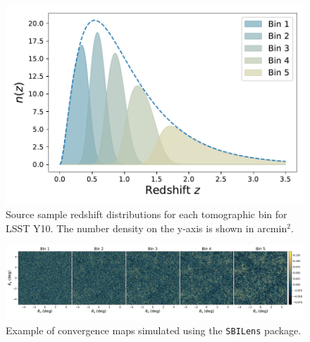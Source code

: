 \documentclass{aa}
\begin{document}
\begin{figure}
    \centering
    \includegraphics[width=\columnwidth]{figures/redshift_distribution_light.pdf}
    \caption{
     Source sample redshift distributions for each tomographic bin for LSST Y10. The number density on the y-axis is shown in arcmin$^2$.
    }
     \label{fig:redshift_distribution}
\end{figure}
\begin{figure}
    \begin{center}
    \includegraphics[width=\textwidth]{figures/example_kmaps.pdf}
    \caption{
     Example of convergence maps simulated using the \texttt{SBILens} package.
    }
     \label{fig:convergence_maps}
     \end{center}
\end{figure}
\end{document}
